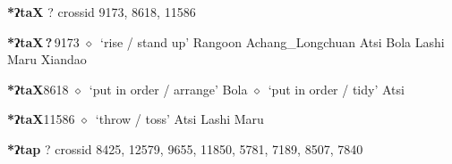 \item
\textbf{*ʔtaX}
?
  {\tiny crossid 9173, 8618, 11586}
  \begin{list}{}{\leftmargin=1.5em \itemindent=-1.5em}
  \item {\footnotesize \textbf{*ʔtaX\,?\,}}{\tiny 9173}
         $\diamond$~`rise / stand up'
         Rangoon 
\hspace{1ex}
         Achang\_Longchuan 
\hspace{1ex}
         Atsi 
\hspace{1ex}
         Bola 
\hspace{1ex}
         Lashi 
\hspace{1ex}
         Maru 
\hspace{1ex}
         Xiandao 
  \item {\footnotesize \textbf{*ʔtaX}}{\tiny 8618}
\hspace{1ex}
         $\diamond$~`put in order / arrange'
         Bola 
\hspace{1ex}
         $\diamond$~`put in order / tidy'
         Atsi 
  \item {\footnotesize \textbf{*ʔtaX}}{\tiny 11586}
\hspace{1ex}
         $\diamond$~`throw / toss'
         Atsi 
\hspace{1ex}
         Lashi 
\hspace{1ex}
         Maru 
  \end{list}
\item
\textbf{*ʔtap}
?
  {\tiny crossid 8425, 12579, 9655, 11850, 5781, 7189, 8507, 7840}
